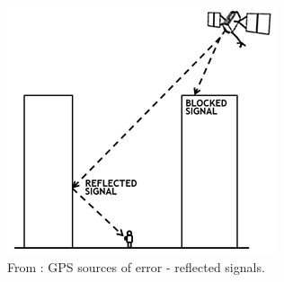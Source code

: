 \begin{figure}
    \includegraphics[scale=0.5]{figures/gps-reflect.jpg}
    \caption{From \cite{gpsGov}: GPS sources of error - reflected signals.}
\label{fig:gps:reflect}
\end{figure}
